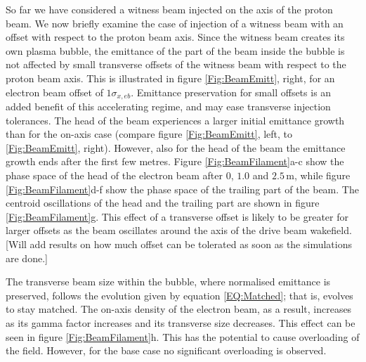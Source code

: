 \documentclass[aps,prstab,reprint,amsmath,amssymb,groupedaddress]{revtex4-1}
\newcommand{\unit}[1]{\,\mathrm{#1}}
\begin{document}
So far we have considered a witness beam injected on the axis of the proton beam. We now briefly examine the case of
injection of a witness beam with an offset with respect to the proton beam axis. Since the witness beam creates its own
plasma bubble, the emittance of the part of the beam inside the bubble is not affected by small transverse offsets of
the witness beam with respect to the proton beam axis. This is illustrated in figure \ref{Fig:BeamEmitt}, right, for an
electron beam offset of $1\sigma_{x,eb}$. Emittance preservation for small offsets is an added benefit of this
accelerating regime, and may ease transverse injection tolerances. The head of the beam experiences a larger initial
emittance growth than for the on-axis case (compare figure \ref{Fig:BeamEmitt}, left, to \ref{Fig:BeamEmitt}, right).
However, also for the head of the beam the emittance growth ends after the first few metres.
Figure \ref{Fig:BeamFilament}a-c show the phase space of the head of the electron beam after $0$, $1.0$ and
$2.5\unit{m}$, while figure \ref{Fig:BeamFilament}d-f show the phase space of the trailing part of the beam. The
centroid oscillations of the head and the trailing part are shown in figure \ref{Fig:BeamFilament}g. This effect of a
transverse offset is likely to be greater for larger offsets as the beam oscillates around the axis of the drive beam
wakefield. [Will add results on how much offset can be tolerated as soon as the simulations are done.]

The transverse beam size within the bubble, where normalised emittance is preserved, follows the evolution given by
equation \ref{EQ:Matched}; that is, evolves to stay matched. The on-axis density of the electron beam, as a result,
increases as its gamma factor increases and its transverse size decreases. This effect can be seen in figure
\ref{Fig:BeamFilament}h. This has the potential to cause overloading of the field. However, for the base case no
significant overloading is observed.  
\end{document}
